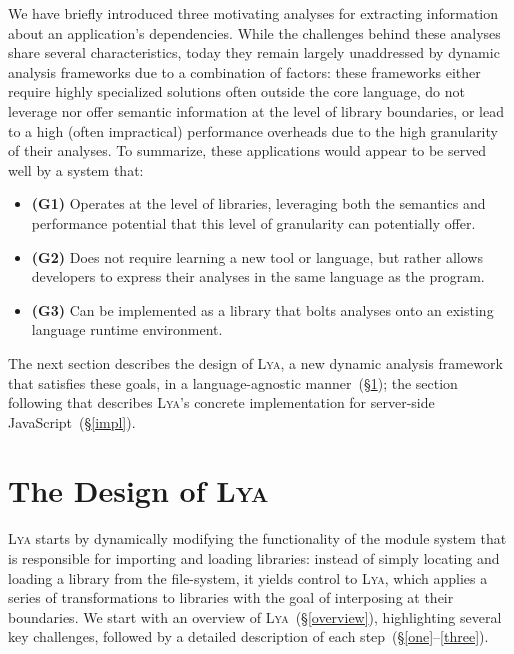 \documentclass[letterpaper,twocolumn,10pt]{article}
\newcommand{\sx}[1]{(\S\ref{#1})}
\newcommand{\sys}{{\scshape Lya}\xspace}
\begin{document}
We have briefly introduced three motivating analyses for extracting information about an application's dependencies.
While the challenges behind these analyses share several characteristics, today they remain largely unaddressed by dynamic analysis frameworks due to a combination of factors:
  these frameworks either require highly specialized solutions often outside the core language,
  do not leverage nor offer semantic information at the level of library boundaries, or
  lead to a high (often impractical) performance overheads due to the high granularity of their analyses.
To summarize, these applications would appear to be served well by a system that:
\begin{itemize}
  \item \textbf{(G1)} Operates at the level of libraries, leveraging both the semantics and performance potential that this level of granularity can potentially offer.
  \item \textbf{(G2)} Does not require learning a new tool or language, but rather allows developers to express their analyses in the same language as the program.
  \item \textbf{(G3)} Can be implemented as a library that bolts analyses onto an existing language runtime environment.
\end{itemize}

The next section describes the design of \sys, a new dynamic analysis framework that satisfies these goals, in a language-agnostic manner~\sx{design};
  the section following that describes \sys's concrete implementation for server-side JavaScript~\sx{impl}.

\section{The Design of \sys}
\label{design}

\sys starts by dynamically modifying the functionality of the module system that is responsible for importing and loading libraries:
  instead of simply locating and loading a library from the file-system, it yields control to \sys, which applies a series of transformations to libraries with the goal of interposing at their boundaries.
We start with an overview of \sys~\sx{overview}, highlighting several key challenges, followed by a detailed description of each step~(\S\ref{one}--\ref{three}).
\end{document}
